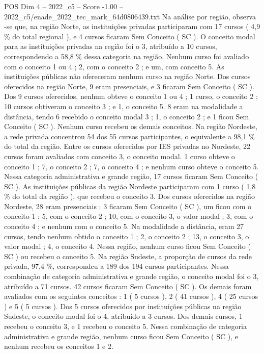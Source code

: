 \begin{textsample}{POS Dim 4 – 2022\_c5 – Score -1.00 – 2022\_c5/enade\_2022\_tec\_mark\_64d0806439.txt}
Na análise por região, observa -se que, na região Norte, as instituições privadas participaram com 17 cursos ( 4,9 \% do total regional ), e 4 cursos ficaram Sem Conceito ( SC ).
O conceito modal para as instituições privadas na região foi o 3, atribuído a 10 cursos, correspondendo a 58,8 \% dessa categoria na região.
Nenhum curso foi avaliado com o conceito 1 ou 4 ; 2, com o conceito 2 ; e um, com conceito 5.
As instituições públicas não ofereceram nenhum curso na região Norte.
Dos cursos oferecidos na região Norte, 9 eram presenciais, e 3 ficaram Sem Conceito ( SC ).
Dos 9 cursos oferecidos, nenhum obteve o conceito 1 ou 4 ; 1 curso, o conceito 2 ; 10 cursos obtiveram o conceito 3 ; e 1, o conceito 5. 8 eram na modalidade a distância, tendo 6 recebido o conceito modal 3 ; 1, o conceito 2 ; e 1 ficou Sem Conceito ( SC ).
Nenhum curso recebeu os demais conceitos.
Na região Nordeste, a rede privada concentrou 54 dos 55 cursos participantes, o equivalente a 98,1 \% do total da região.
Entre os cursos oferecidos por IES privadas no Nordeste, 22 cursos foram avaliados com conceito 3, o conceito modal. 1 curso obteve o conceito 1 ; 7, o conceito 2 ; 7, o conceito 4 ; e nenhum curso obteve o conceito 5.
Nessa categoria administrativa e grande região, 17 cursos ficaram Sem Conceito ( SC ).
As instituições públicas da região Nordeste participaram com 1 curso ( 1,8 \% do total da região ), que recebeu o conceito 3.
Dos cursos oferecidos na região Nordeste, 28 eram presenciais : 3 ficaram Sem Conceito ( SC ), um ficou com o conceito 1 ; 5, com o conceito 2 ; 10, com o conceito 3, o valor modal ; 3, com o conceito 4 ; e nenhum com o conceito 5.
Na modalidade a distância, eram 27 cursos, tendo nenhum obtido o conceito 1 ; 2, o conceito 2 ; 13, o conceito 3, o valor modal ; 4, o conceito 4.
Nessa região, nenhum curso ficou Sem Conceito ( SC ) ou recebeu o conceito 5.
Na região Sudeste, a proporção de cursos da rede privada, 97,4 \%, correspondeu a 189 dos 194 cursos participantes.
Nessa combinação de categoria administrativa e grande região, o conceito modal foi o 3, atribuído a 71 cursos. 42 cursos ficaram Sem Conceito ( SC ).
Os demais foram avaliados com os seguintes conceitos : 1 ( 5 cursos ), 2 ( 41 cursos ), 4 ( 25 cursos ) e 5 ( 5 cursos ).
Dos 5 cursos oferecidos por instituições públicas na região Sudeste, o conceito modal foi o 4, atribuído a 3 cursos.
Dos demais cursos, 1 recebeu o conceito 3, e 1 recebeu o conceito 5.
Nessa combinação de categoria administrativa e grande região, nenhum curso ficou Sem Conceito ( SC ), e nenhum recebeu os conceitos 1 e 2.

\end{textsample}
